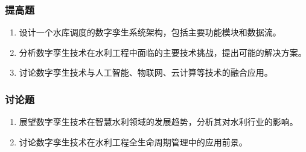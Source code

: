 \hypertarget{ux63d0ux9ad8ux9898-7}{%
\subsubsection{提高题}\label{ux63d0ux9ad8ux9898-7}}

\begin{enumerate}
\def\labelenumi{\arabic{enumi}.}
\tightlist
\item
  设计一个水库调度的数字孪生系统架构，包括主要功能模块和数据流。
\item
  分析数字孪生技术在水利工程中面临的主要技术挑战，提出可能的解决方案。
\item
  讨论数字孪生技术与人工智能、物联网、云计算等技术的融合应用。
\end{enumerate}

\hypertarget{ux8ba8ux8bbaux9898-7}{%
\subsubsection{讨论题}\label{ux8ba8ux8bbaux9898-7}}

\begin{enumerate}
\def\labelenumi{\arabic{enumi}.}
\tightlist
\item
  展望数字孪生技术在智慧水利领域的发展趋势，分析其对水利行业的影响。
\item
  讨论数字孪生技术在水利工程全生命周期管理中的应用前景。
\end{enumerate}